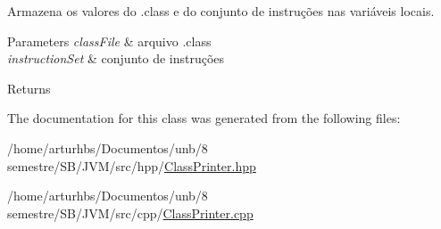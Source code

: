 Armazena os valores do .class e do conjunto de instruções nas variáveis locais. 


\begin{DoxyParams}{Parameters}
{\em class\+File} & arquivo .class \\
\hline
{\em instruction\+Set} & conjunto de instruções \\
\hline
\end{DoxyParams}
\begin{DoxyReturn}{Returns}

\end{DoxyReturn}


The documentation for this class was generated from the following files\+:\begin{DoxyCompactItemize}
\item 
/home/arturhbs/\+Documentos/unb/8 semestre/\+S\+B/\+J\+V\+M/src/hpp/\hyperlink{ClassPrinter_8hpp}{Class\+Printer.\+hpp}\item 
/home/arturhbs/\+Documentos/unb/8 semestre/\+S\+B/\+J\+V\+M/src/cpp/\hyperlink{ClassPrinter_8cpp}{Class\+Printer.\+cpp}\end{DoxyCompactItemize}
